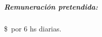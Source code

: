 \documentclass[a4paper,10pt]{article}
\newcommand\remuneracion{}
\renewcommand\remuneracion{}
\renewcommand\remuneracion{\subparagraph{Remuneraci\'on pretendida:}\$\number\platita\ por 6 hs diarias.}
\begin{document}
\maketitle









\remuneracion
\end{document}
